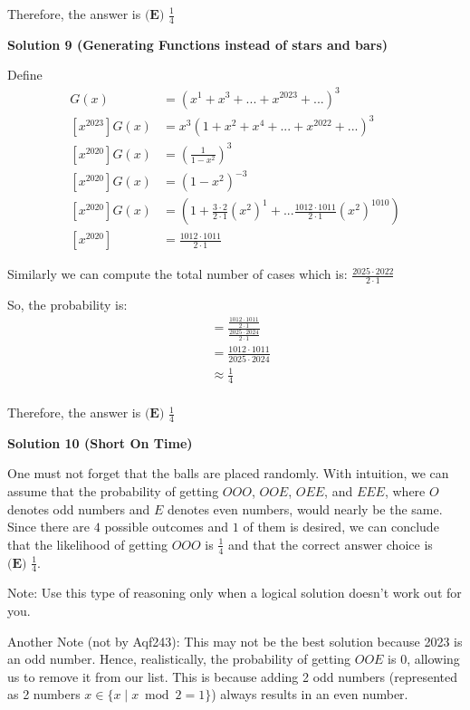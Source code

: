 \begin{enumerate}
 Therefore, the answer is $\boxed{\textbf{(E) }\frac{1}{4}}$




\textbf{Solution 9 (Generating Functions instead of stars and bars)}

Define 
 \begin{align*} [x^{2023}]G(x)&=(x^1 + x^3 + ... + x^{2023} + ...)^3 \\ [x^{2023}]G(x)&= x^3(1+x^2+x^4+...+x^{2022}+...)^3 \\ [x^{2020}]G(x)&= (\frac{1}{1-x^2})^3 \\ [x^{2020}]G(x)&= (1-x^2)^{-3} \\ [x^{2020}]G(x)&= (1 + \frac{3 \cdot 2}{2 \cdot 1}(x^2)^1 + ... \frac{1012 \cdot 1011}{2 \cdot 1}(x^2)^{1010}) \\ [x^{2020}] &= \frac{1012 \cdot 1011}{2 \cdot 1} \end{align*}


 Similarly we can compute the total number of cases which is: $\frac{2025\cdot 2022}{2 \cdot 1}$

 So, the probability is: 
 \begin{align*} &= \frac {\frac{1012 \cdot 1011}{2 \cdot 1}}{\frac{2025\cdot 2024}{2 \cdot 1}} \\ &= \frac{1012 \cdot 1011}{2025 \cdot 2024} \\ &\approx \frac{1}{4} \\ \end{align*}


 Therefore, the answer is $\boxed{\textbf{(E) }\frac{1}{4}}$




\textbf{Solution 10 (Short On Time)}

One must not forget that the balls are placed randomly. With intuition, we can assume that the probability of getting $OOO$, $OOE$, $OEE$, and $EEE$, where $O$ denotes odd numbers and $E$ denotes even numbers, would nearly be the same. Since there are $4$ possible outcomes and $1$ of them is desired, we can conclude that the likelihood of getting $OOO$ is $\frac{1}{4}$ and that the correct answer choice is $\boxed{\textbf{(E) }\frac{1}{4}}$.

 Note: Use this type of reasoning only when a logical solution doesn't work out for you.

 Another Note (not by Aqf243): This may not be the best solution because 2023 is an odd number. Hence, realistically, the probability of getting $OOE$ is 0, allowing us to remove it from our list. This is because adding 2 odd numbers (represented as 2 numbers $x \in \{ x \mid x \bmod 2 = 1 \}$) always results in an even number.


\end{enumerate}

